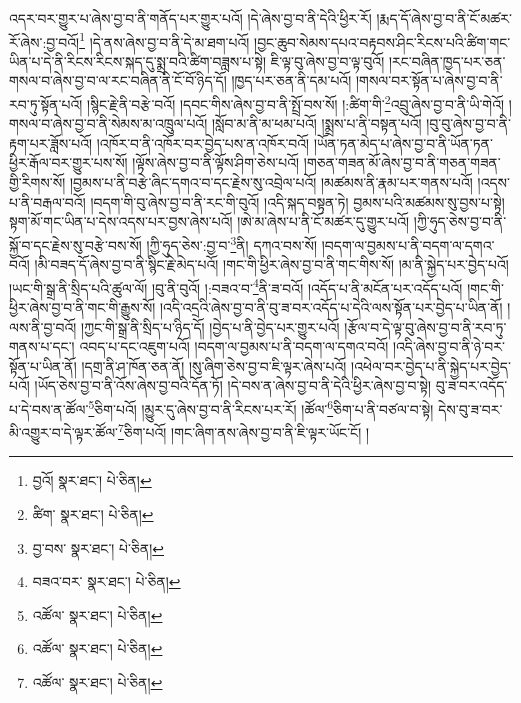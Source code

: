 འདར་བར་གྱུར་པ་ཞེས་བྱ་བ་ནི་གནོད་པར་གྱུར་པའོ། །དེ་ཞེས་བྱ་བ་ནི་དེའི་ཕྱིར་རོ། །རྨད་དོ་ཞེས་བྱ་བ་ནི་ངོ་མཚར་རོ་ཞེས་:བྱ་བའོ།\footnote{བྱའོ།  སྣར་ཐང་།  པེ་ཅིན། } །དེ་ནས་ཞེས་བྱ་བ་ནི་དེ་མ་ཐག་པའོ། །བྱང་ཆུབ་སེམས་དཔའ་བརྟབས་ཤིང་རིངས་པའི་ཚིག་གང་ཡིན་པ་དེ་ནི་རིངས་རིངས་སྐད་དུ་སྨྲ་བའི་ཚིག་བཟླས་པ་སྟེ། ཇི་ལྟ་བུ་ཞེས་བྱ་བ་ལྟ་བུའོ། །རང་བཞིན་ཁྱད་པར་ཅན་གསལ་བ་ཞེས་བྱ་བ་ལ་རང་བཞིན་ནི་ངོ་བོ་ཉིད་དོ། །ཁྱད་པར་ཅན་ནི་དམ་པའོ། །གསལ་བར་སྟོན་པ་ཞེས་བྱ་བ་ནི་རབ་ཏུ་སྟོན་པའོ། །སྙིང་རྗེ་ནི་བརྩེ་བའོ། །དབང་གིས་ཞེས་བྱ་བ་ནི་སྤྲོ་བས་སོ། །:ཚིག་གི་\footnote{ཚིག་  སྣར་ཐང་།  པེ་ཅིན། }འབྲུ་ཞེས་བྱ་བ་ནི་ཡི་གེའོ། །གསལ་བ་ཞེས་བྱ་བ་ནི་སེམས་མ་འཁྲུལ་པའོ། །སློབ་མ་ནི་མ་ཕམ་པའོ། །སྨྲས་པ་ནི་བསྟན་པའོ། །བུ་བུ་ཞེས་བྱ་བ་ནི་རྟག་པར་ཟློས་པའོ། །འཁོར་བ་ནི་འཁོར་བར་བྱེད་པས་ན་འཁོར་བའོ། །ཡོན་ཏན་མེད་པ་ཞེས་བྱ་བ་ནི་ཡོན་ཏན་ཕྱིར་རྒོལ་བར་གྱུར་པས་སོ། །ལྟོས་ཞེས་བྱ་བ་ནི་ལྟོས་ཤིག་ཅེས་པའོ། །གཅན་གཟན་མོ་ཞེས་བྱ་བ་ནི་གཅན་གཟན་གྱི་རིགས་སོ། །བྱམས་པ་ནི་བརྩེ་ཞིང་དགའ་བ་དང་རྗེས་སུ་འབྲེལ་པའོ། །མཚམས་ནི་རྣམ་པར་གནས་པའོ། །འདས་པ་ནི་བརྒལ་བའོ། །བདག་གི་བུ་ཞེས་བྱ་བ་ནི་རང་གི་བུའོ། །འདི་སྐད་བསྟན་ཏེ། བྱམས་པའི་མཚམས་སུ་བྱས་པ་སྟེ། སྟག་མོ་གང་ཡིན་པ་དེས་འདས་པར་བྱས་ཞེས་པའོ། །ཨེ་མ་ཞེས་པ་ནི་ངོ་མཚར་དུ་གྱུར་པའོ། །ཀྱི་ཧུད་ཅེས་བྱ་བ་ནི་སྐྱོ་བ་དང་རྗེས་སུ་བརྩེ་བས་སོ། །ཀྱི་ཧུད་ཅེས་:བྱ་བ་\footnote{བྱ་བས་  སྣར་ཐང་།  པེ་ཅིན། }ནི། དཀའ་བས་སོ། །བདག་ལ་བྱམས་པ་ནི་བདག་ལ་དགའ་བའོ། །མི་བཟད་དོ་ཞེས་བྱ་བ་ནི་སྙིང་རྗེ་མེད་པའོ། །གང་གི་ཕྱིར་ཞེས་བྱ་བ་ནི་གང་གིས་སོ། །མ་ནི་སྐྱེད་པར་བྱེད་པའོ། །ཡང་གི་སྒྲ་ནི་སྲིད་པའི་ཚུལ་ལོ། །བུ་ནི་བུའོ། །:བཟའ་བ་\footnote{བཟའ་བར་  སྣར་ཐང་།  པེ་ཅིན། }ནི་ཟ་བའོ། །འདོད་པ་ནི་མངོན་པར་འདོད་པའོ། །གང་གི་ཕྱིར་ཞེས་བྱ་བ་ནི་གང་གི་རྒྱུས་སོ། །འདི་འདྲའི་ཞེས་བྱ་བ་ནི་བུ་ཟ་བར་འདོད་པ་དེའི་ལས་སྟོན་པར་བྱེད་པ་ཡིན་ནོ། །ལས་ནི་བྱ་བའོ། །ཀྱང་གི་སྒྲ་ནི་སྲིད་པ་ཉིད་དོ། །བྱེད་པ་ནི་བྱེད་པར་གྱུར་པའོ། །རྩོལ་བ་དེ་ལྟ་བུ་ཞེས་བྱ་བ་ནི་རབ་ཏུ་གནས་པ་དང་། འབད་པ་དང་འཇུག་པའོ། །བདག་ལ་བྱམས་པ་ནི་བདག་ལ་དགའ་བའོ། །འདི་ཞེས་བྱ་བ་ནི་ཉེ་བར་སྟོན་པ་ཡིན་ནོ། །དགྲ་ནི་ཤ་ཁོན་ཅན་ནོ། །སུ་ཞིག་ཅེས་བྱ་བ་ཇི་ལྟར་ཞེས་པའོ། །འཕེལ་བར་བྱེད་པ་ནི་སྐྱེད་པར་བྱེད་པའོ། །ཡོད་ཅེས་བྱ་བ་ནི་འོས་ཞེས་བྱ་བའི་དོན་ཏོ། །དེ་བས་ན་ཞེས་བྱ་བ་ནི་དེའི་ཕྱིར་ཞེས་བྱ་བ་སྟེ། བུ་ཟ་བར་འདོད་པ་དེ་བས་ན་ཚོལ་\footnote{འཚོལ་  སྣར་ཐང་།  པེ་ཅིན། }ཅིག་པའོ། །མྱུར་དུ་ཞེས་བྱ་བ་ནི་རིངས་པར་རོ། །ཚོལ་\footnote{འཚོལ་  སྣར་ཐང་།  པེ་ཅིན། }ཅིག་པ་ནི་བཙལ་བ་སྟེ། དེས་བུ་ཟ་བར་མི་འགྱུར་བ་དེ་ལྟར་ཚོལ་\footnote{འཚོལ་  སྣར་ཐང་།  པེ་ཅིན། }ཅིག་པའོ། །གང་ཞིག་ནས་ཞེས་བྱ་བ་ནི་ཇི་ལྟར་ཡོང་ངོ། །
